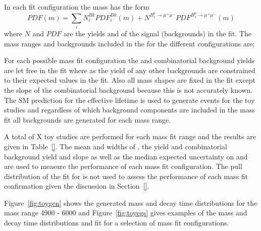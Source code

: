 {In each fit configuration the mass \pdf has the form
\begin{equation}
PDF(m) = \displaystyle\sum_{i} N^{Bk}_{i}PDF^{Bk}_{i}(m) + N^{B^{0}_{s} \to \mu^{+} \mu^{-}}PDF^{B^{0}_{s} \to \mu^{+} \mu^{-}}(m)
\end{equation}
where $N$ and $PDF$ are the yields and \pdfs of the signal (backgrounds) in the fit. The mass ranges and backgrounds included in the \pdf for the different configurations are;


For each possible mass fit configuration the \bsmumu and combinatorial background yields are let free in the fit where as the yield of any other backgrounds are constrained to their expected values in the fit. Also all mass shapes are fixed in the \ml fit except the slope of the combinatorial background because this is not accurately known.
The SM prediction for the \bsmumu effective lifetime is used to generate events for the toy studies and regardless of which background components are included in the mass fit all backgrounds are generated for each mass range. 

A total of X toy studies are performed for each mass fit range and the results are given in Table~\ref{}. The mean and widths of \Gmumu, the \bsmumu yield and combinatorial background yield and slope as well as the median expected uncertainty on \tmumu and \Gmumu are used to measure the performance of each mass fit configuration. The pull distribution of the fit for \tmumu is not used to assess the performance of each mass fit confirmation given the discussion in Section~\ref{}.

Figure~\ref{fig:toygen} shows the generated mass and decay time distributions for the mass range 4900 - 6000 and Figure~\ref{fig:toyegs} gives examples of the mass and decay time distributions and \ml fit for a selection of mass fit configurations. 

}

